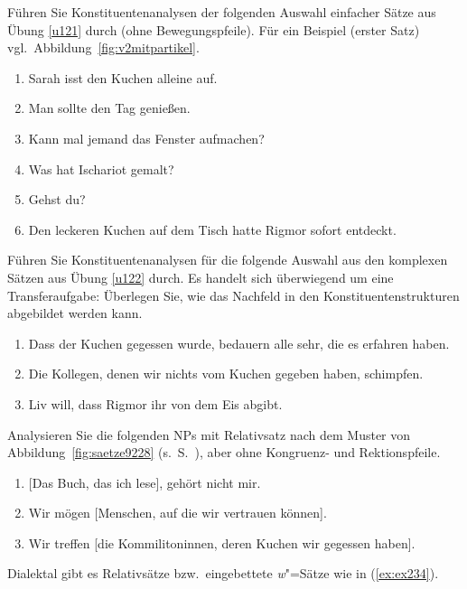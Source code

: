 \Uebung \label{u123} Führen Sie Konstituentenanalysen der folgenden Auswahl einfacher Sätze aus Übung \ref{u121} durch (ohne Bewegungspfeile).
Für ein Beispiel (erster Satz) vgl.\ Abbildung~\ref{fig:v2mitpartikel}.

\begin{enumerate}\Lf
  \item{Sarah isst den Kuchen alleine auf.}
  \item{Man sollte den Tag genießen.}
  \item{Kann mal jemand das Fenster aufmachen?}
  \item{Was hat Ischariot gemalt?}
  \item{Gehst du?}
  \item{Den leckeren Kuchen auf dem Tisch hatte Rigmor sofort entdeckt.}
\end{enumerate}

\Uebung[\tristar] \label{u124} Führen Sie Konstituentenanalysen für die folgende Auswahl aus den komplexen Sätzen aus Übung \ref{u122} durch.
Es handelt sich überwiegend um eine Transferaufgabe:
Überlegen Sie, wie das Nachfeld in den Konstituentenstrukturen abgebildet werden kann.

\begin{enumerate}\Lf
  \item Dass der Kuchen gegessen wurde, bedauern alle sehr, die es erfahren haben.
  \item Die Kollegen, denen wir nichts vom Kuchen gegeben haben, schimpfen.
  \item Liv will, dass Rigmor ihr von dem Eis abgibt.
\end{enumerate}

\Uebung[\tristar] \label{u125} Analysieren Sie die folgenden NPs mit Relativsatz nach dem Muster von Abbildung~\ref{fig:saetze9228} (s.\ S.~\pageref{fig:saetze9228}), aber ohne Kongruenz- und Rektionspfeile.

\begin{enumerate}\Lf
  \item{[Das Buch, das ich lese], gehört nicht mir.}
  \item Wir mögen [Menschen, auf die wir vertrauen können].
  \item Wir treffen [die Kommilitoninnen, deren Kuchen wir gegessen haben].
\end{enumerate}

\Uebung[\tristar] \label{u126} Dialektal gibt es Relativsätze bzw.\ eingebettete \textit{w}"=Sätze wie in (\ref{ex:ex234}).

